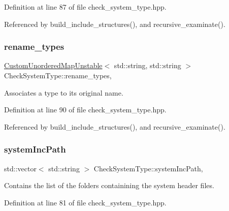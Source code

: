 Definition at line 87 of file check\+\_\+system\+\_\+type.\+hpp.



Referenced by build\+\_\+include\+\_\+structures(), and recursive\+\_\+examinate().

\mbox{\label{classCheckSystemType_a73529c87de98015d0373156d3c0cb326}} 
\subsubsection{\texorpdfstring{rename\+\_\+types}{rename\_types}}
{\footnotesize\ttfamily \hyperlink{custom__map_8hpp_a8cbaceffc09790a885ec7e9c17809c69}{Custom\+Unordered\+Map\+Unstable}$<$ std\+::string, std\+::string $>$ Check\+System\+Type\+::rename\+\_\+types\hspace{0.3cm}{\ttfamily [static]}, {\ttfamily [private]}}



Associates a type to its original name. 



Definition at line 90 of file check\+\_\+system\+\_\+type.\+hpp.



Referenced by build\+\_\+include\+\_\+structures(), and recursive\+\_\+examinate().

\mbox{\label{classCheckSystemType_a039ba0b9690c9ef162e26fc2eb2f275b}} 
\subsubsection{\texorpdfstring{system\+Inc\+Path}{systemIncPath}}
{\footnotesize\ttfamily std\+::vector$<$ std\+::string $>$ Check\+System\+Type\+::system\+Inc\+Path\hspace{0.3cm}{\ttfamily [static]}, {\ttfamily [private]}}



Contains the list of the folders containining the system header files. 



Definition at line 81 of file check\+\_\+system\+\_\+type.\+hpp.



